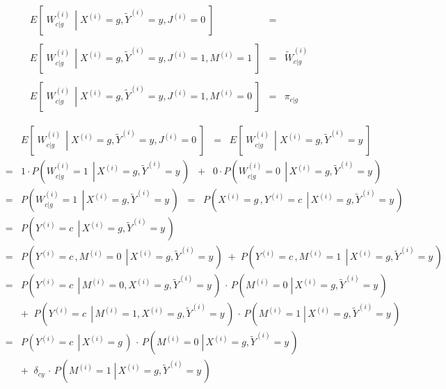 \vskip 0.3cm
\noindent
\begin{equation*}
\begin{array}{lcl}
E\!\left[\;\left.W^{(i)}_{c \vert g}\,\;\right\vert\;X^{(i)}=g,\widetilde{Y}^{(i)}=y,J^{(i)}=0\;\right]
&=& 
\\ \\
E\!\left[\;\left.W^{(i)}_{c \vert g}\,\;\right\vert\;X^{(i)}=g,\widetilde{Y}^{(i)}=y,J^{(i)}=1,M^{(i)}=1\;\right]
&=& \widetilde{W}^{(i)}_{c \vert g}
\\ \\
E\!\left[\;\left.W^{(i)}_{c \vert g}\,\;\right\vert\;X^{(i)}=g,\widetilde{Y}^{(i)}=y,J^{(i)}=1,M^{(i)}=0\;\right]
&=& \pi_{c \vert g}
\end{array}
\end{equation*}

\begin{eqnarray*}
&&
	E\!\left[\;\left.W^{(i)}_{c \vert g}\,\;\right\vert\;X^{(i)}=g,\widetilde{Y}^{(i)}=y,J^{(i)}=0\;\right]
\;\;=\;\;
	E\!\left[\;\left.W^{(i)}_{c \vert g}\,\;\right\vert\;X^{(i)}=g,\widetilde{Y}^{(i)}=y\;\right]
\\
&=&
	1 \cdot P\!\left(\left.W^{(i)}_{c \vert g} = 1\,\;\right\vert\,X^{(i)}=g,\widetilde{Y}^{(i)}=y\,\right)
	\;\;+\;\;
	0 \cdot P\!\left(\left.W^{(i)}_{c \vert g} = 0\,\;\right\vert\,X^{(i)}=g,\widetilde{Y}^{(i)}=y\,\right)
\\
&=&
	P\!\left(\left.W^{(i)}_{c \vert g} = 1\,\;\right\vert\,X^{(i)}=g,\widetilde{Y}^{(i)}=y\,\right)
\;\; = \;\;
	P\!\left(\left.X^{(i)} = g\,,Y^{(i)} = c\,\;\right\vert\,X^{(i)}=g,\widetilde{Y}^{(i)}=y\,\right)
\\
& = &
	P\!\left(\left.Y^{(i)} = c\,\;\right\vert\,X^{(i)}=g,\widetilde{Y}^{(i)}=y\,\right)
\\
&=&
	P\!\left(\left.Y^{(i)} = c\,,M^{(i)}=0\,\;\right\vert\,X^{(i)}=g,\widetilde{Y}^{(i)}=y\,\right)
	\; + \; P\!\left(\left.Y^{(i)} = c\,,M^{(i)}=1\,\;\right\vert\,X^{(i)}=g,\widetilde{Y}^{(i)}=y\,\right)
\\
&=&
	P\!\left(\left.Y^{(i)} = c\,\;\right\vert\,M^{(i)}=0,X^{(i)}=g,\widetilde{Y}^{(i)}=y\,\right)
	\,\cdot\,
	P\!\left(\left.M^{(i)}=0\;\right\vert\,X^{(i)}=g,\widetilde{Y}^{(i)}=y\,\right)
\\
&&
	+ \;\;
	P\!\left(\left.Y^{(i)} = c\,\;\right\vert\,M^{(i)}=1,X^{(i)}=g,\widetilde{Y}^{(i)}=y\,\right)
	\,\cdot\,
	P\!\left(\left.M^{(i)}=1\;\right\vert\,X^{(i)}=g,\widetilde{Y}^{(i)}=y\,\right)
\\
&=&
	P\!\left(\left.Y^{(i)} = c\,\;\right\vert\,X^{(i)}=g\,\right)
	\,\cdot\,
	P\!\left(\left.M^{(i)}=0\;\right\vert\,X^{(i)}=g,\widetilde{Y}^{(i)}=y\,\right)
\\
&&
	+ \;\;
	\delta_{cy}
	\,\cdot\,
	P\!\left(\left.M^{(i)}=1\;\right\vert\,X^{(i)}=g,\widetilde{Y}^{(i)}=y\,\right)
\end{eqnarray*}

